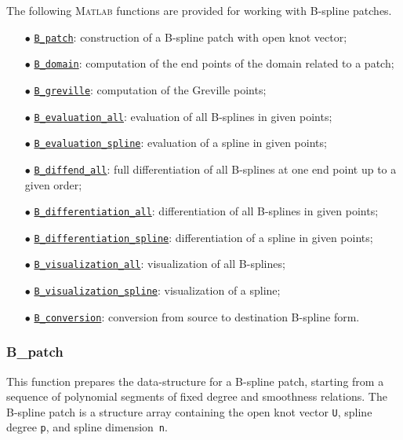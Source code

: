 \documentclass[10pt]{./acmtrans2e}
\newcommand{\Matlab}{\textsc{Matlab} }
\begin{document}
The following \Matlab functions are provided for working with B-spline patches.
\begin{itemize}
  \item[$\bullet$] \hyperref[sec:matlab-b-patch]{\texttt{B\_patch}}: 
     construction of a B-spline patch with open knot vector;
  \item[$\bullet$] \hyperref[sec:matlab-b-domain]{\texttt{B\_domain}}: 
     computation of the end points of the domain related to a patch;
  \item[$\bullet$] \hyperref[sec:matlab-b-greville]{\texttt{B\_greville}}: 
     computation of the Greville points;
  \item[$\bullet$] \hyperref[sec:matlab-b-evaluation-all]{\texttt{B\_evaluation\_all}}: 
     evaluation of all B-splines in given points;
  \item[$\bullet$] \hyperref[sec:matlab-b-evaluation-spline]{\texttt{B\_evaluation\_spline}}: 
     evaluation of a spline in given points;
  \item[$\bullet$] \hyperref[sec:matlab-b-diffend-all]{\texttt{B\_diffend\_all}}: 
     full differentiation of all B-splines at one end point up to a given order;
  \item[$\bullet$] \hyperref[sec:matlab-b-differentiation-all]{\texttt{B\_differentiation\_all}}: 
     differentiation of all B-splines in given points;
  \item[$\bullet$] \hyperref[sec:matlab-b-differentiation-spline]{\texttt{B\_differentiation\_spline}}: 
     differentiation of a spline in given points;
  \item[$\bullet$] \hyperref[sec:matlab-b-visualization-all]{\texttt{B\_visualization\_all}}: 
     visualization of all B-splines;
  \item[$\bullet$] \hyperref[sec:matlab-b-visualization-spline]{\texttt{B\_visualization\_spline}}: 
     visualization of a spline;
  \item[$\bullet$] \hyperref[sec:matlab-b-conversion]{\texttt{B\_conversion}}: 
     conversion from source to destination B-spline form.
\end{itemize}


\subsubsection{B\_patch} \label{sec:matlab-b-patch}

This function prepares the data-structure for a B-spline patch, starting from a sequence of polynomial segments of fixed degree and smoothness relations. The B-spline patch is a structure array containing the open knot vector \texttt{U}, spline degree \texttt{p}, and spline dimension~\texttt{n}. 
\end{document}
